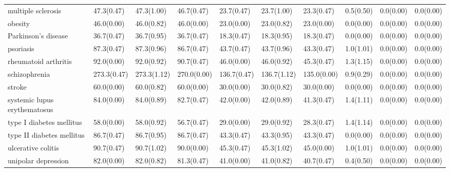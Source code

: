 \begin{table}[H]
{\begin{tabular}{llllllllll}
multiple sclerosis & 47.3(0.47) & 47.3(1.00) & 46.7(0.47) & 23.7(0.47) & 23.7(1.00) & 23.3(0.47) & 0.5(0.50) & 0.0(0.00) & 0.0(0.00)\\
obesity & 46.0(0.00) & 46.0(0.82) & 46.0(0.00) & 23.0(0.00) & 23.0(0.82) & 23.0(0.00) & 0.0(0.00) & 0.0(0.00) & 0.0(0.00)\\
Parkinson's disease & 36.7(0.47) & 36.7(0.95) & 36.7(0.47) & 18.3(0.47) & 18.3(0.95) & 18.3(0.47) & 0.0(0.00) & 0.0(0.00) & 0.0(0.00)\\
psoriasis & 87.3(0.47) & 87.3(0.96) & 86.7(0.47) & 43.7(0.47) & 43.7(0.96) & 43.3(0.47) & 1.0(1.01) & 0.0(0.00) & 0.0(0.00)\\
rheumatoid arthritis & 92.0(0.00) & 92.0(0.92) & 90.7(0.47) & 46.0(0.00) & 46.0(0.92) & 45.3(0.47) & 1.3(1.15) & 0.0(0.00) & 0.0(0.00)\\
\addlinespace
schizophrenia & 273.3(0.47) & 273.3(1.12) & 270.0(0.00) & 136.7(0.47) & 136.7(1.12) & 135.0(0.00) & 0.9(0.29) & 0.0(0.00) & 0.0(0.00)\\
stroke & 60.0(0.00) & 60.0(0.82) & 60.0(0.00) & 30.0(0.00) & 30.0(0.82) & 30.0(0.00) & 0.0(0.00) & 0.0(0.00) & 0.0(0.00)\\
systemic lupus erythematosus & 84.0(0.00) & 84.0(0.89) & 82.7(0.47) & 42.0(0.00) & 42.0(0.89) & 41.3(0.47) & 1.4(1.11) & 0.0(0.00) & 0.0(0.00)\\
type I diabetes mellitus & 58.0(0.00) & 58.0(0.92) & 56.7(0.47) & 29.0(0.00) & 29.0(0.92) & 28.3(0.47) & 1.4(1.14) & 0.0(0.00) & 0.0(0.00)\\
type II diabetes mellitus & 86.7(0.47) & 86.7(0.95) & 86.7(0.47) & 43.3(0.47) & 43.3(0.95) & 43.3(0.47) & 0.0(0.00) & 0.0(0.00) & 0.0(0.00)\\
\addlinespace
ulcerative colitis & 90.7(0.47) & 90.7(1.02) & 90.0(0.00) & 45.3(0.47) & 45.3(1.02) & 45.0(0.00) & 1.0(1.01) & 0.0(0.00) & 0.0(0.00)\\
unipolar depression & 82.0(0.00) & 82.0(0.82) & 81.3(0.47) & 41.0(0.00) & 41.0(0.82) & 40.7(0.47) & 0.4(0.50) & 0.0(0.00) & 0.0(0.00)\\
\bottomrule
\end{tabular}}
\end{table}

